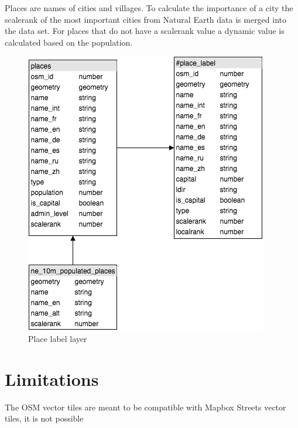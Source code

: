 Places are names of cities and villages. To calculate the importance of a city
the scalerank of the most important cities from Natural Earth data is merged into the
\osm{} data set. For places that do not have a scalerank value a dynamic value is calculated
based on the population.

\begin{figure}[H]
\centering
  \includegraphics[scale=0.6]{images/place_layer.png}
  \caption{Place label layer}
\end{figure}

\section{Limitations}\label{limitations}
The OSM vector tiles are meant to be compatible with Mapbox Streets vector tiles, it is not possible 
